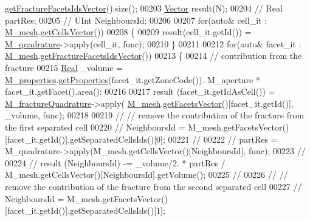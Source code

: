\begin{DoxyCode}
      \hyperlink{classFVCode3D_1_1Rigid__Mesh_aadbe6d9ad704122537903396d91238e0}{getFractureFacetsIdsVector}().size();
00203     \hyperlink{namespaceFVCode3D_a16ccf345652402bccd1a5d2e6782526c}{Vector} result(N);
00204 \textcolor{comment}{//    Real partRes;}
00205 \textcolor{comment}{//    UInt NeighboursId;}
00206 
00207     \textcolor{keywordflow}{for}(\textcolor{keyword}{auto}& cell\_it : \hyperlink{classFVCode3D_1_1Quadrature_abaa2519ea32065df30242bd5f5cb2d01}{M\_mesh}.\hyperlink{classFVCode3D_1_1Rigid__Mesh_afefb62f2c37317402b495e2369ed495b}{getCellsVector}())
00208     \{
00209         result(cell\_it.getId()) = \hyperlink{classFVCode3D_1_1Quadrature_a9a128b9525429cca80435552ee3b6e56}{M\_quadrature}->apply(cell\_it, func);
00210     \}
00211 
00212     \textcolor{keywordflow}{for}(\textcolor{keyword}{auto}& facet\_it : \hyperlink{classFVCode3D_1_1Quadrature_abaa2519ea32065df30242bd5f5cb2d01}{M\_mesh}.\hyperlink{classFVCode3D_1_1Rigid__Mesh_aadbe6d9ad704122537903396d91238e0}{getFractureFacetsIdsVector}())
00213     \{
00214         \textcolor{comment}{// contribution from the fracture}
00215         \hyperlink{namespaceFVCode3D_a40c1f5588a248569d80aa5f867080e83}{Real} \_volume = \hyperlink{classFVCode3D_1_1Quadrature_ace6cd23087209d3186ae173c265cde39}{M\_properties}.\hyperlink{classFVCode3D_1_1PropertiesMap_ace888d15c9a4ab13d5e217a3a565604c}{getProperties}(facet\_it.getZoneCode()).
      M\_aperture * facet\_it.getFacet().area();
00216 
00217         result (facet\_it.getIdAsCell()) = \hyperlink{classFVCode3D_1_1Quadrature_afc75e45ee2a0a8be3cd39f93c2ef0b7e}{M\_fractureQuadrature}->apply(
      \hyperlink{classFVCode3D_1_1Quadrature_abaa2519ea32065df30242bd5f5cb2d01}{M\_mesh}.\hyperlink{classFVCode3D_1_1Rigid__Mesh_a6d3cdd4ef8a5225599953179d5302636}{getFacetsVector}()[facet\_it.getId()], \_volume, func);
00218 
00219 \textcolor{comment}{//        // remove the contribution of the fracture from the first separated cell}
00220 \textcolor{comment}{//        NeighboursId = M\_mesh.getFacetsVector()[facet\_it.getId()].getSeparatedCellsIds()[0];}
00221 \textcolor{comment}{//}
00222 \textcolor{comment}{//        partRes = M\_quadrature->apply(M\_mesh.getCellsVector()[NeighboursId], func);}
00223 \textcolor{comment}{//}
00224 \textcolor{comment}{//        result (NeighboursId) -= \_volume/2. * partRes /
       M\_mesh.getCellsVector()[NeighboursId].getVolume();}
00225 \textcolor{comment}{//}
00226 \textcolor{comment}{//        // remove the contribution of the fracture from the second separated cell}
00227 \textcolor{comment}{//        NeighboursId = M\_mesh.getFacetsVector()[facet\_it.getId()].getSeparatedCellsIds()[1];}

\end{DoxyCode}
